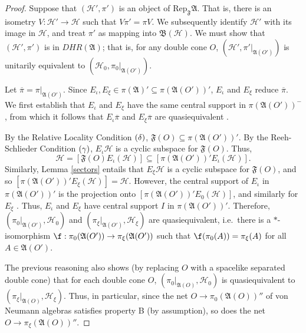 \documentclass[11pt]{article}
\newcommand{\alg}[1]{\mathfrak{#1}}
\newcommand{\bh}{\mathfrak{B}(\mathcal{H})}
\theoremstyle{definition}
\theoremstyle{definition}
\theoremstyle{remark}
\def\2#1{{\mathcal #1}}
\def\ol#1{{\overline #1}}
\def\al#1{{\mathfrak #1}}
\newcommand{\Rep}{\mathrm{Rep}}
\begin{document}
\begin{proof} Suppose that $(\2H ',\pi ')$ is an object of $\Rep _{\al
    F}\al A$.  That is, there is an isometry $V:\2H '\to \2H$ such
  that $V\pi '=\pi V$.  We subsequently identify $\2H '$ with its
  image in $\2H$, and treat $\pi '$ as mapping into $\bh$.  We must
  show that $(\2H ',\pi ')$ is in $DHR(\al A)$; that is, for any
  double cone $O$, $(\2H ',\pi '|_{\alg{A}(O')})$ is unitarily
  equivalent to $(\2H_0,\pi _0|_{\alg{A}(O')})$.  

  Let $\overline{\pi}=\pi |_{\alg{A}(O')}$.  Since
  $E_{\iota},E_{\xi}\in \pi (\alg{A})'\subseteq \pi
  (\alg{A}(O'))'$, $E_{\iota}$ and $E_{\xi}$ reduce
  $\overline{\pi}$.  We first establish that
  $E_{\iota}$ and $E_{\xi}$ have the same central
  support in $\pi (\alg{A}(O'))^{-}$, from which it
  follows that $E_{\iota}\ol\pi$ and $E_{\xi}\ol\pi$
  are quasiequivalent \cite[Thm.\ 10.3.3]{kr}.

  By the Relative Locality Condition $(\boldmath{\delta})$,
  $\alg{F}(O)\subseteq \pi (\alg{A}(O'))'$.  By the Reeh-Schlieder
  Condition $(\boldmath{\gamma})$, $E_{\iota}\2H$ is a cyclic subspace
  for $\alg{F}(O)$.  Thus,
$$ \2H =[\alg{F}(O)E_{\iota}(\2H )]\subseteq [\pi (\alg{A}(O'))'E_{\iota}(\2H )] .$$  
Similarly, Lemma \ref{sectors} entails that
$E_{\xi}\2H$ is a cyclic subspace for $\alg{F}(O)$, and
so $[\pi (\alg{A}(O'))'E_{\xi}(\2H )]=\2H$.  However,
the central support of $E_\iota$ in $\pi
(\alg{A}(O'))'$ is the projection onto
$[\pi(\alg{A}(O'))'E_0(\2H )]$, and similarly for
$E_{\xi}$ \cite[Prop.\ 5.5.2]{kr}.  Thus, $E_{\iota}$
and $E_{\xi}$ have central support $I$ in $\pi
(\alg{A}(O'))'$.  Therefore, $(\pi
_{0}|_{\alg{A}(O')},\2H _0)$ and $(\pi
_{\xi}|_{\alg{A}(O')},\2H _{\xi})$ are quasiequivalent,
i.e.\ there is a $*$-isomorphism $\f :\pi
_0(\alg{A}(O'))\to \pi _{\xi}(\alg{A}(O'))$ such that
$\f (\pi _0(A))=\pi _{\xi}(A)$ for all $A\in
\alg{A}(O')$.

The previous reasoning also shows (by replacing $O$ with a spacelike
separated double cone) that for each double cone $O$, $(\pi
_{0}|_{\alg{A}(O)},\2H_0)$ is quasiequivalent to $(\pi
_{\xi}|_{\alg{A}(O)},\2H _{\xi})$.  Thus, in particular, since the net
$O\to \pi _0(\alg{A}(O))''$ of von Neumann algebras satisfies property
B (by assumption), so does the net $O\to \pi _{\xi}(\alg{A}(O))''$.


\end{proof}
\end{document}

